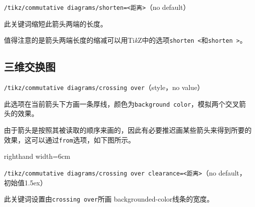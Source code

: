 \documentclass{ctexart}
\begin{document}
\begin{tcblisting}{}
\end{tcblisting}
\par {\color{red}\texttt{/tikz/commutative diagrams/shorten=<距离>}}\hfill （no default）
\par 此关键词缩短此箭头两端的长度。
\begin{tcblisting}{}
\end{tcblisting}
值得注意的是箭头两端长度的缩减可以用Ti\emph{k}Z中的选项\verb|shorten <|和\verb|shorten >|。
\subsection{三维交换图}
\par {\color{red}\texttt{/tikz/commutative diagrams/crossing over}}\hfill （style，no value）
\par 此选项在当前箭头下方画一条厚线，颜色为\verb|background color|，模拟两个交叉箭头的效果。
\begin{tcblisting}{}
\end{tcblisting}
由于箭头是按照其被读取的顺序来画的，因此有必要推迟画某些箭头来得到所要的效果，这可以通过\verb|from|选项，如下图所示。
\begin{tcblisting}{righthand width=6cm}
\end{tcblisting}
\par {\color{red}\texttt{/tikz/commutative diagrams/crossing over clearance=<距离>}}\hfill （no default，初始值1.5ex）
\par 此关键词设置由\verb|crossing over|所画 backgrounded-color线条的宽度。
\end{document}
